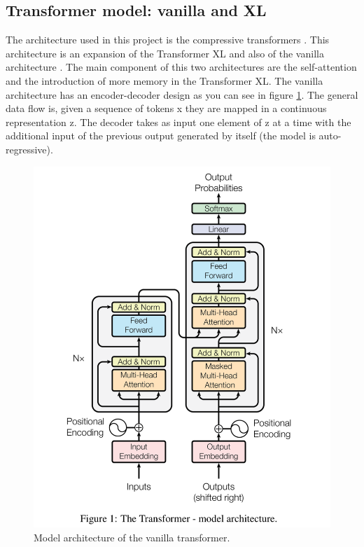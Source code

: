 \subsection{Transformer model: vanilla and XL}
\label{sec:transformer}
The architecture used in this project is the compressive transformers \cite{raecompressive2019}. This architecture is an expansion of the Transformer XL \cite{tranformerxl} and also of the vanilla architecture \cite{AIAYN}. The main component of this two architectures are the self-attention and the introduction of more memory in the Transformer XL. The vanilla architecture has an encoder-decoder design as you can see in figure \ref{fig:vanilla_model}. The general data flow is, given a sequence of tokens x they are mapped in a continuous representation z. The decoder takes as input one element of z at a time with the additional input of the previous output generated by itself (the model is auto-regressive).
\begin{figure}[H]
	\begin{center}
		\includegraphics[width=0.4\linewidth]{img/tranformer_architecture.png}
	\end{center}
	\caption{Model architecture of the vanilla transformer.}
	\label{fig:vanilla_model}
\end{figure} 

